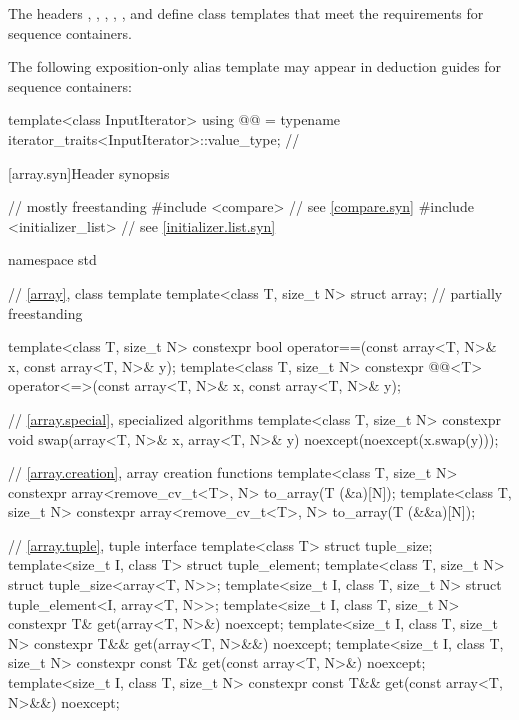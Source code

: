 \pnum
The headers
,
,
,
,
, and
define class templates that meet the requirements for sequence containers.

\pnum
The following exposition-only alias template may appear in deduction guides for sequence containers:

\begin{codeblock}
template<class InputIterator>
  using @@ = typename iterator_traits<InputIterator>::value_type;  // \expos
\end{codeblock}

[array.syn]{Header  synopsis}

%
\begin{codeblock}
// mostly freestanding
#include <compare>              // see \ref{compare.syn}
#include <initializer_list>     // see \ref{initializer.list.syn}

namespace std {
  // \ref{array}, class template 
  template<class T, size_t N> struct array;                             // partially freestanding

  template<class T, size_t N>
    constexpr bool operator==(const array<T, N>& x, const array<T, N>& y);
  template<class T, size_t N>
    constexpr @@<T>
      operator<=>(const array<T, N>& x, const array<T, N>& y);

  // \ref{array.special}, specialized algorithms
  template<class T, size_t N>
    constexpr void swap(array<T, N>& x, array<T, N>& y) noexcept(noexcept(x.swap(y)));

  // \ref{array.creation}, array creation functions
  template<class T, size_t N>
    constexpr array<remove_cv_t<T>, N> to_array(T (&a)[N]);
  template<class T, size_t N>
    constexpr array<remove_cv_t<T>, N> to_array(T (&&a)[N]);

  // \ref{array.tuple}, tuple interface
  template<class T> struct tuple_size;
  template<size_t I, class T> struct tuple_element;
  template<class T, size_t N>
    struct tuple_size<array<T, N>>;
  template<size_t I, class T, size_t N>
    struct tuple_element<I, array<T, N>>;
  template<size_t I, class T, size_t N>
    constexpr T& get(array<T, N>&) noexcept;
  template<size_t I, class T, size_t N>
    constexpr T&& get(array<T, N>&&) noexcept;
  template<size_t I, class T, size_t N>
    constexpr const T& get(const array<T, N>&) noexcept;
  template<size_t I, class T, size_t N>
    constexpr const T&& get(const array<T, N>&&) noexcept;
}
\end{codeblock}

